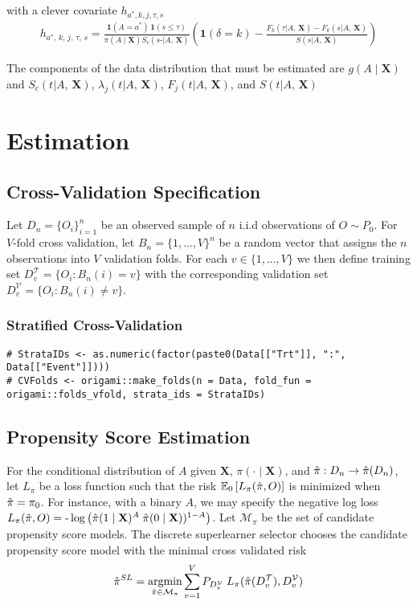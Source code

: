\documentclass{report}
\newcommand{\1}{\ensuremath{\mathbf{1}}}
\DeclareMathOperator*{\argmin}{argmin}
\newcommand{\X}{\ensuremath{\mathbf{X}}}
\newcommand{\AX}{\ensuremath{\mid A,\,\mathbf{X}}}
\newcommand{\trt}{\ensuremath{a^*}}
\newcommand{\tk}{\ensuremath{\tau}}
\newcommand{\jj}{\ensuremath{k}}
\newcommand{\g}{\ensuremath{\pi}}
\begin{document}
with a clever covariate  $h_{\trt, \jj, j, \tk, s}$ 
\begin{align*}
    h_{\trt,\, \jj,\, j,\, \tk,\, s} = \frac{\1(A = \trt)\, \1(s \leq \tk)}{\g(A \mid \X) S_c(s\text{-} \AX)} \left(\1(\delta = \jj) - \frac{F_\jj(\tk \AX) - F_\jj(s \AX)}{S(s \AX)}\right)
\end{align*}

The components of the data distribution that must be estimated are $g(A \mid \X)$ and $S_c(t \AX)$, $\lambda_j(t \AX)$, $F_j(t \AX)$, and $S(t \AX)$

\section*{Estimation}
\label{sec:org0a66d6f}
\subsection*{Cross-Validation Specification}
\label{sec:org1e8d6f5}
Let \(D_n = \{O_i\}_{i=1}^n\) be an observed sample of \(n\) i.i.d observations of \(O \sim P_0\). For \(V\text{-fold}\) cross validation, let \(B_n = \{1, ... , V\}^n\) be a random vector that assigns the \(n\) observations into \(V\) validation folds. For each \(v \in \{1, ..., V\}\) we then define training set \(D^\mathcal{T}_v = \{O_i : B_n(i) = v\}\) with the corresponding validation set \(D^\mathcal{V}_v = \{O_i : B_n(i) \neq v\}\).

\subsubsection*{Stratified Cross-Validation}
\label{sec:orga507f6e}

\begin{lstlisting}
# StrataIDs <- as.numeric(factor(paste0(Data[["Trt"]], ":", Data[["Event"]])))
# CVFolds <- origami::make_folds(n = Data, fold_fun = origami::folds_vfold, strata_ids = StrataIDs)
\end{lstlisting}

\subsection*{Propensity Score Estimation}
\label{sec:orga5d0a29}

For the conditional distribution of $A$ given $\X$, $\pi(\cdot \mid \X)$, and $\Hat{\pi} : D_n \to \Hat{\pi}(D_n)$, let $L_\pi$ be a loss function such that the risk $\mathbb{E}_0\left[L_\pi(\Hat{\pi}, O)\right]$ is minimized when $\Hat{\pi} = \pi_0$. For instance, with a binary $A$, we may specify the negative log loss $L_\pi(\Hat{\pi}, O) = \text{-}\log\left(\Hat{\pi}(1 \mid \X)^A \; \Hat{\pi}(0 \mid \X))^{1-A}\right)$. Let $\mathcal{M_\pi}$ be the set of candidate propensity score models. The discrete superlearner selector chooses the candidate propensity score model with the minimal cross validated risk 
\[ \Hat{\pi}^{SL} = \argmin_{\Hat{\pi} \in \mathcal{M}_\pi} \sum_{v = 1}^{V} P_{D^\mathcal{V}_v} \; L_\pi(\Hat{\pi}(D^\mathcal{T}_v), D^\mathcal{V}_v)\]
\end{document}
